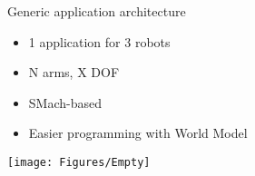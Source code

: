 \documentclass[12pt,a4paper]{article}
\newcommand{\emptylogo}{\texttt{[image: Figures/Empty]}}
\begin{document}
\begin{slidetop}
\begin{multicols}{2}
\vspace{-0.5cm} %

\begin{bclogo}[couleur = white, arrondi = 0.25, couleurBord = tuedarkblue , barre = none, logo=\emptylogo]{\textcolor{tuedarkblue}{Generic application architecture}}
\begin{itemize}[topsep=0pt, itemsep = 0pt, parsep = 0pt, leftmargin=15pt]
	\item 1 application for 3 robots
    \item N arms, X DOF
    \item SMach-based
    \item Easier programming with World Model
\end{itemize}
\end{bclogo}

%

\texttt{[image: Figures/Empty]}
\end{multicols}
\end{slidetop}
\end{document}
